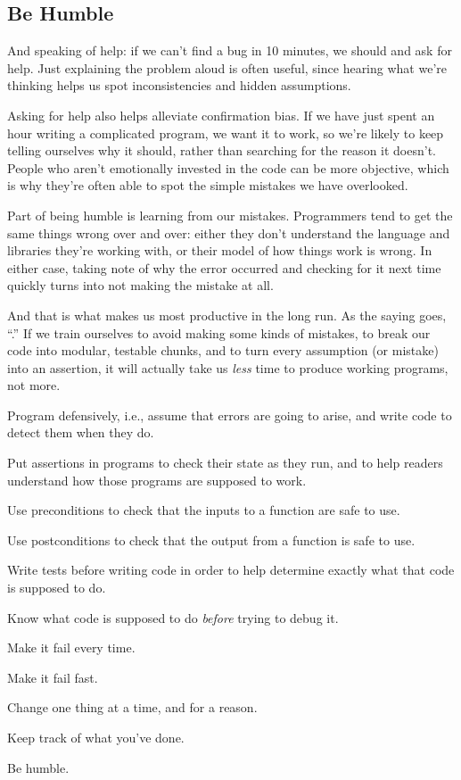 \subsection*{Be Humble}

And speaking of help: if we can't find a bug in 10 minutes, we should
 and ask for help. Just
explaining the problem aloud is often useful, since hearing what we're
thinking helps us spot inconsistencies and hidden assumptions.

Asking for help also helps alleviate confirmation bias. If we have just
spent an hour writing a complicated program, we want it to work, so
we're likely to keep telling ourselves why it should, rather than
searching for the reason it doesn't. People who aren't emotionally
invested in the code can be more objective, which is why they're often
able to spot the simple mistakes we have overlooked.

Part of being humble is learning from our mistakes. Programmers tend to
get the same things wrong over and over: either they don't understand
the language and libraries they're working with, or their model of how
things work is wrong. In either case, taking note of why the error
occurred and checking for it next time quickly turns into not making the
mistake at all.

And that is what makes us most productive in the long run. As the saying
goes, ``.'' If we train
ourselves to avoid making some kinds of mistakes, to break our code into
modular, testable chunks, and to turn every assumption (or mistake) into
an assertion, it will actually take us \emph{less} time to produce
working programs, not more.

\begin{keypoints}
\begin{swcitemize}
\item
  Program defensively, i.e., assume that errors are going to arise, and
  write code to detect them when they do.
\item
  Put assertions in programs to check their state as they run, and to
  help readers understand how those programs are supposed to work.
\item
  Use preconditions to check that the inputs to a function are safe to
  use.
\item
  Use postconditions to check that the output from a function is safe to
  use.
\item
  Write tests before writing code in order to help determine exactly
  what that code is supposed to do.
\item
  Know what code is supposed to do \emph{before} trying to debug it.
\item
  Make it fail every time.
\item
  Make it fail fast.
\item
  Change one thing at a time, and for a reason.
\item
  Keep track of what you've done.
\item
  Be humble.
\end{swcitemize}
\end{keypoints}

